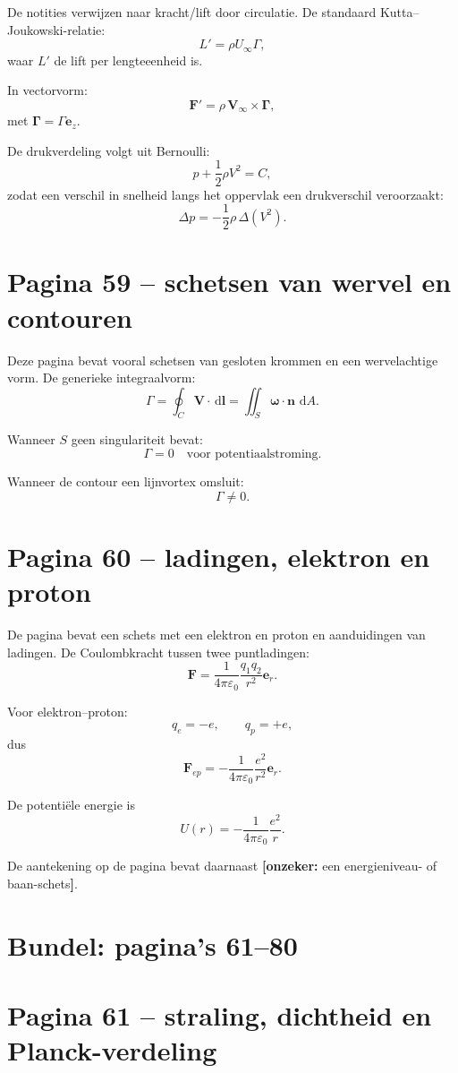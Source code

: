 \documentclass[11pt,a4paper]{article}
\newcommand{\onzeker}[1]{\ifmmode\text{\color{red!70!black}\bfseries[onzeker]}\else\textcolor{red!70!black}{\textbf{[onzeker:} #1\textbf{]}}\fi}
\newcommand{\dd}{\,\mathrm{d}}
\newcommand{\V}{\mathbf{V}}
\newcommand{\omegav}{\bm{\omega}}
\begin{document}
De notities verwijzen naar kracht/lift door circulatie. De standaard Kutta--Joukowski-relatie:
$$
L'
=
\rho U_\infty \Gamma,
$$
waar $L'$ de lift per lengteeenheid is.

In vectorvorm:
$$
\mathbf{F}'
=
\rho\,\V_\infty\times\bm{\Gamma},
$$
met $\bm{\Gamma}=\Gamma\mathbf{e}_z$.

De drukverdeling volgt uit Bernoulli:
$$
p + \frac{1}{2}\rho V^2 = C,
$$
zodat een verschil in snelheid langs het oppervlak een drukverschil veroorzaakt:
$$
\Delta p
=
-\frac{1}{2}\rho\,\Delta\left(V^2\right).
$$

\section*{Pagina 59 -- schetsen van wervel en contouren}

Deze pagina bevat vooral schetsen van gesloten krommen en een wervelachtige vorm. De generieke integraalvorm:
$$
\Gamma
=
\oint_C \V\cdot\dd\mathbf{l}
=
\iint_S \omegav\cdot\mathbf{n}\,\dd A.
$$

Wanneer $S$ geen singulariteit bevat:
$$
\Gamma = 0
\quad
\text{voor potentiaalstroming}.
$$

Wanneer de contour een lijnvortex omsluit:
$$
\Gamma \neq 0.
$$

\section*{Pagina 60 -- ladingen, elektron en proton}

De pagina bevat een schets met een elektron en proton en aanduidingen van ladingen. De Coulombkracht tussen twee puntladingen:
$$
\mathbf{F}
=
\frac{1}{4\pi\varepsilon_0}
\frac{q_1q_2}{r^2}\mathbf{e}_r.
$$

Voor elektron--proton:
$$
q_e=-e,
\qquad
q_p=+e,
$$
dus
$$
\mathbf{F}_{ep}
=
-\frac{1}{4\pi\varepsilon_0}
\frac{e^2}{r^2}\mathbf{e}_r.
$$

De potentiële energie is
$$
U(r)
=
-\frac{1}{4\pi\varepsilon_0}
\frac{e^2}{r}.
$$

De aantekening op de pagina bevat daarnaast \onzeker{een energieniveau- of baan-schets}.

\clearpage
\section*{Bundel: pagina's 61--80}
\section*{Pagina 61 -- straling, dichtheid en Planck-verdeling}
\end{document}
